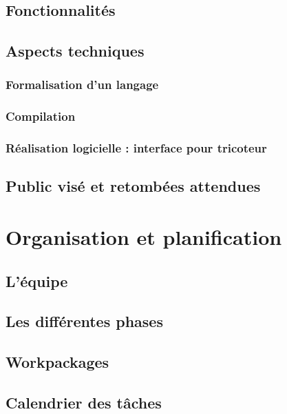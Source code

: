 \documentclass{article}
\begin{document}
\subsection{Fonctionnalités}

\subsection{Aspects techniques}

\subsubsection{Formalisation d'un langage}

\subsubsection{Compilation}

\subsubsection{Réalisation logicielle : interface pour tricoteur}

\subsection{Public visé et retombées attendues}

\section{Organisation et planification}

\subsection{L'équipe}

\subsection{Les différentes phases}

\subsection{Workpackages}

\subsection{Calendrier des tâches}
\end{document}
